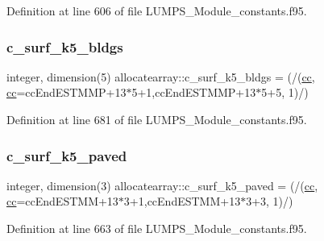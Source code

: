 Definition at line 606 of file L\+U\+M\+P\+S\+\_\+\+Module\+\_\+constants.\+f95.

\mbox{\label{namespaceallocatearray_a746e5ac0eb74cd9430f4a2b86879b70a}} 
\subsubsection{\texorpdfstring{c\+\_\+surf\+\_\+k5\+\_\+bldgs}{c\_surf\_k5\_bldgs}}
{\footnotesize\ttfamily integer, dimension(5) allocatearray\+::c\+\_\+surf\+\_\+k5\+\_\+bldgs = (/(\hyperlink{namespaceallocatearray_ac863c81704eb507dee10f5e10741e10c}{cc}, \hyperlink{namespaceallocatearray_ac863c81704eb507dee10f5e10741e10c}{cc}=cc\+End\+E\+S\+T\+M\+MP+13$\ast$5+1,cc\+End\+E\+S\+T\+M\+MP+13$\ast$5+5, 1)/)}



Definition at line 681 of file L\+U\+M\+P\+S\+\_\+\+Module\+\_\+constants.\+f95.

\mbox{\label{namespaceallocatearray_a55ea661a6311737a605a66ff4d0686bb}} 
\subsubsection{\texorpdfstring{c\+\_\+surf\+\_\+k5\+\_\+paved}{c\_surf\_k5\_paved}}
{\footnotesize\ttfamily integer, dimension(3) allocatearray\+::c\+\_\+surf\+\_\+k5\+\_\+paved = (/(\hyperlink{namespaceallocatearray_ac863c81704eb507dee10f5e10741e10c}{cc}, \hyperlink{namespaceallocatearray_ac863c81704eb507dee10f5e10741e10c}{cc}=cc\+End\+E\+S\+T\+MM+13$\ast$3+1,cc\+End\+E\+S\+T\+MM+13$\ast$3+3, 1)/)}



Definition at line 663 of file L\+U\+M\+P\+S\+\_\+\+Module\+\_\+constants.\+f95.

\mbox{\label{namespaceallocatearray_addb0a760e3ebe1883e253698960a3075}} 
